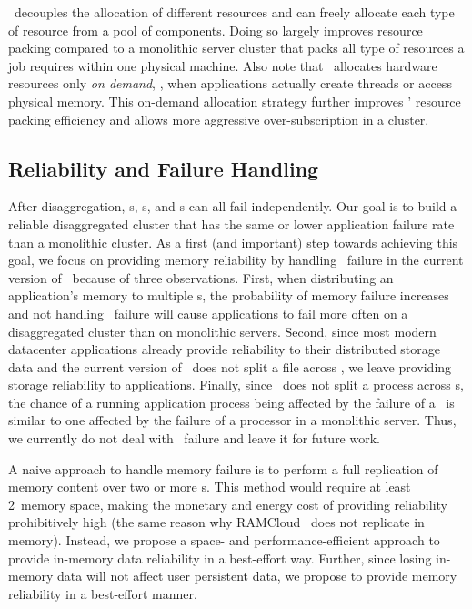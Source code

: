 \lego\ decouples the allocation of different resources and 
can freely allocate each type of resource from a pool of components.
Doing so largely improves resource packing compared to a monolithic server cluster
that packs all type of resources a job requires within one physical machine.
Also note that \lego\ allocates hardware resources only {\em on demand}, 
\ie, when applications actually create threads or access physical memory.
This on-demand allocation strategy further improves \lego' resource packing efficiency
and allows more aggressive over-subscription in a cluster.

\subsection{Reliability and Failure Handling}
\label{sec:lego:failure}
After disaggregation, \pcomponent{}s, \mcomponent{}s, and \scomponent{}s can all fail independently.
Our goal is to build a reliable disaggregated cluster that has the same or lower application failure rate
than a monolithic cluster.
As a first (and important) step towards achieving this goal, %
we focus on providing memory reliability by handling \mcomponent\ failure in the current version of \lego\ because of three observations.
First, when distributing an application's memory to multiple \mcomponent{}s, 
the probability of memory failure increases and not handling \mcomponent\ failure will cause applications to fail more often 
on a disaggregated cluster than on monolithic servers.
Second, since most modern datacenter applications
already provide reliability to their distributed storage data %
and the current version of \lego\ does not split a file across \scomponent,
we leave providing storage reliability to applications.
Finally, since \lego\ does not split a process across \pcomponent{}s,
the chance of a running application process being affected by the failure of a \pcomponent\ is similar to 
one affected by the failure of a processor in a monolithic server.
Thus, we currently do not deal with \pcomponent\ failure and leave it for future work.

A naive approach to handle memory failure is to perform a full replication of memory content over two or more \mcomponent{}s.
This method would require at least 2\x\ memory space,
making the monetary and energy cost of providing reliability prohibitively high (the same reason why RAMCloud~\cite{Ongaro11-RamCloud} does not replicate in memory).
Instead, we propose a space- and performance-efficient approach to provide in-memory data reliability in a best-effort way.
Further, since losing in-memory data will not affect user persistent data,
we propose to provide memory reliability in a best-effort manner.

